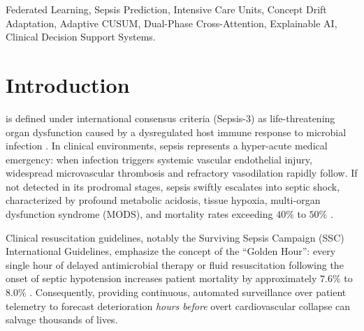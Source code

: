\documentclass[journal,twocolumn,10pt]{IEEEtran}
\begin{document}
\begin{abstract}
AUPRC of 	extbf{0.1043}, lowest ECE of 	extbf{0.0902}, and lowest Brier score of 	extbf{0.0548}. Paired cluster bootstrap testing confirms statistically equivalent discrimination to centralized BiLSTM ($P = .176$) and personalized Ditto ($P = .459$) while delivering superior probability reliability. Depending on clinical deployment requirements, FPDAF supports flexible operating modes, ranging from an \textbf{Early Bedside Screening mode} ($\tau=0.08$, Sensitivity 80.15\%, Specificity 63.85\%) to a \textbf{High-Confidence Rule-In mode} ($\tau=0.65$, Accuracy 96.20\%, Specificity 97.80\%). In a theoretical 50-round deployment model, CSSP achieves up to 38.0\% communication savings (1.52~GB vs. 2.48~GB in Ditto). Paired with an operational point-of-care Clinical Decision Support System (CDSS) providing temporal window attributions, physiological feature saliency, and counterfactual intervention simulation with a cohort mean early warning lead time of \textbf{4.98 hours} (up to 5.8 hours in exemplar cases), FPDAF provides an empirically grounded, privacy-preserving foundation for decentralized early sepsis surveillance.
\end{abstract}

\begin{IEEEkeywords}
Federated Learning, Sepsis Prediction, Intensive Care Units, Concept Drift Adaptation, Adaptive CUSUM, Dual-Phase Cross-Attention, Explainable AI, Clinical Decision Support Systems.
\end{IEEEkeywords}

\section{Introduction}
 is defined under international consensus criteria (Sepsis-3) as life-threatening organ dysfunction caused by a dysregulated host immune response to microbial infection \cite{singer2016sepsis3}. In clinical environments, sepsis represents a hyper-acute medical emergency: when infection triggers systemic vascular endothelial injury, widespread microvascular thrombosis and refractory vasodilation rapidly follow. If not detected in its prodromal stages, sepsis swiftly escalates into septic shock, characterized by profound metabolic acidosis, tissue hypoxia, multi-organ dysfunction syndrome (MODS), and mortality rates exceeding $40\%$ to $50\%$ \cite{evans2021surviving,dusing2025sepsis}. 

Clinical resuscitation guidelines, notably the Surviving Sepsis Campaign (SSC) International Guidelines, emphasize the concept of the ``Golden Hour'': every single hour of delayed antimicrobial therapy or fluid resuscitation following the onset of septic hypotension increases patient mortality by approximately $7.6\%$ to $8.0\%$ \cite{evans2021surviving}. Consequently, providing continuous, automated surveillance over patient telemetry to forecast deterioration \textit{hours before} overt cardiovascular collapse can salvage thousands of lives.
\end{document}
